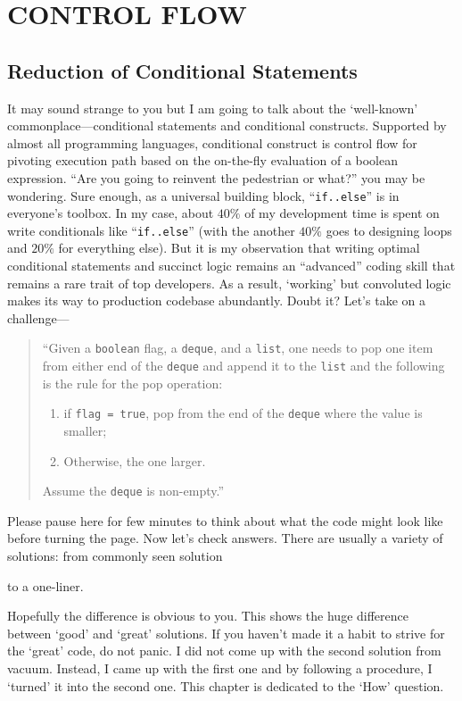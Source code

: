 \documentclass[oneside,11pt]{book}
\theoremstyle{definition}
\theoremstyle{remark}
\newcommand{\code}[1]{\mbox{\lstinline{#1}}}
\begin{document}
    \part{\uppercase{Control Flow}}\label{prt:flowControl}

    \clearpage{}

\chapter{Reduction of Conditional Statements}\label{ch:organizeYourIfElse}

It may sound strange to you but I am going to talk about the `well-known'
commonplace---conditional statements and conditional constructs.
Supported by almost all programming languages, conditional construct is control
flow for pivoting execution path based on the on-the-fly evaluation of a boolean expression.
``Are you going to reinvent the pedestrian or what?'' you may be wondering.
Sure enough, as a universal building block, ``\code{if..else}'' is in everyone's toolbox.
In my case, about $40\%$ of my development time is spent on write
conditionals like ``\code{if..else}'' (with the another $40\%$ goes to designing loops and $20\%$
for everything else).
But it is my observation that writing optimal conditional statements and
succinct logic remains an ``advanced'' coding skill that remains a rare trait of top developers.
As a result, `working' but convoluted logic makes its way to production codebase abundantly.
Doubt it?
Let's take on a challenge---
\begin{quote}
    ``Given a \code{boolean} flag, a \code{deque}, and a \code{list}, one
    needs to pop one item from either end of the \code{deque} and append it
    to the \code{list} and the following is the rule for the pop operation:
    \begin{enumerate}
        \item if \code{flag = true}, pop from the end of the \code{deque} where the value is
        smaller;
        \item Otherwise, the one larger.
    \end{enumerate}
    Assume the \code{deque} is non-empty.''
\end{quote}
Please pause here for few minutes to think about what the code might look like before turning the
page.
\clearpage
Now let's check answers.
There are usually a variety of solutions: from commonly seen solution

to a one-liner.

Hopefully the difference is obvious to you.
This shows the huge difference between `good' and `great' solutions.
If you haven't made it a habit to strive for the `great' code, do not panic.
I did not come up with the second solution from vacuum.
Instead, I came up with the first one and by following a procedure, I `turned' it into the second
one.
This chapter is dedicated to the `How' question.
\end{document}
